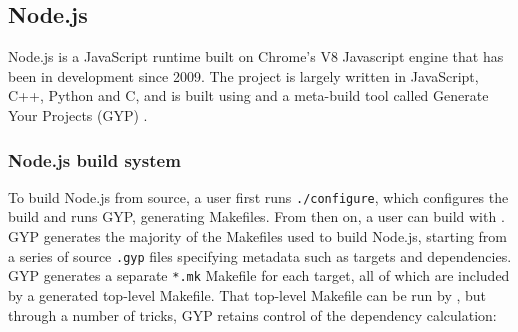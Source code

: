 



\subsection{Node.js}
\label{sec:eval:node}

Node.js is a JavaScript runtime built on Chrome's V8 Javascript engine that has been in development since 2009.  The project is largely written in JavaScript, C++, Python and C, and is built using \Make and a meta-build tool called Generate Your Projects (GYP) \cite{gyp}.

\subsubsection{Node.js build system}

To build Node.js from source, a user first runs \texttt{./configure}, which configures the build and runs GYP, generating Makefiles. From then on, a user can build with \Make. GYP generates the majority of the Makefiles used to build Node.js, starting from a series of source \texttt{.gyp} files specifying metadata such as targets and dependencies. GYP generates a separate \texttt{*.mk} Makefile for each target, all of which are included by a generated top-level Makefile. That top-level Makefile can be run by \Make, but through a number of tricks, GYP retains control of the dependency calculation:

